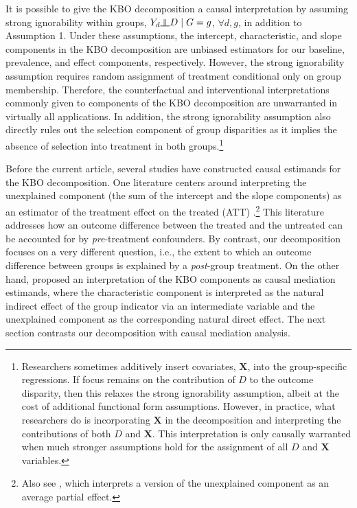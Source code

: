 \documentclass[12pt,a4paper]{article}
\newcommand{\indep}{\rotatebox[origin=c]{90}{$\models$}}  %
\def\X{{\boldsymbol X}}
\begin{document}
It is possible to give the KBO decomposition a causal interpretation by assuming strong ignorability within groups, $Y_d \indep D \mid  G=g$, $\forall d, g$, in addition to Assumption 1. Under these assumptions, the intercept, characteristic, and slope components in the KBO decomposition are unbiased estimators for our baseline, prevalence, and effect components, respectively. However, the strong ignorability assumption requires random assignment of treatment conditional only on group membership. Therefore, the counterfactual and interventional interpretations commonly given to components of the KBO decomposition \citep[e.g.,][]{jann_blinderoaxaca_2008} are unwarranted in virtually all applications. In addition, the strong ignorability assumption also directly rules out the selection component of group disparities as it implies the absence of selection into treatment in both groups.\footnote{Researchers sometimes additively insert covariates, $\X$, into the group-specific regressions. If focus remains on the contribution of $D$ to the outcome disparity, then this relaxes the strong ignorability assumption, albeit at the cost of additional functional form assumptions. However, in practice, what researchers do is incorporating $\X$ in the decomposition and interpreting the contributions of both $D$ and $\X$. This interpretation is only causally warranted when much stronger assumptions hold for the assignment of all $D$ and $\X$ variables.}

Before the current article, several studies have constructed causal estimands for the KBO decomposition. One literature centers around interpreting the unexplained component (the sum of the intercept and the slope components) as an estimator of the treatment effect on the treated (ATT) \citep{fortin_decomposition_2011, kline_oaxaca-blinder_2011, yamaguchi_decomposition_2015}.\footnote{Also see \citet{chernozhukov_sorted_2018}, which interprets a version of the unexplained component as an average partial effect.} This literature addresses how an outcome difference between the treated and the untreated can be accounted for by \emph{pre}-treatment confounders. By contrast, our decomposition focuses on a very different question, i.e., the extent to which an outcome difference between groups is explained by a \emph{post}-group treatment. On the other hand, \citet{huber_causal_2015} proposed an interpretation of the KBO components as causal mediation estimands, where the characteristic component is interpreted as the natural indirect effect \citep{pearl_direct_2001} of the group indicator via an intermediate variable and the unexplained component as the corresponding natural direct effect. The next section contrasts our decomposition with causal mediation analysis.
\end{document}
